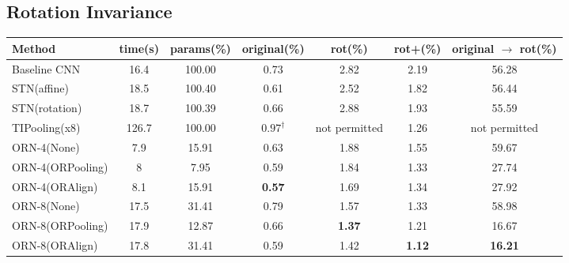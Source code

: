 \documentclass[10pt,twocolumn,letterpaper]{article}
\begin{document}
\subsection{Rotation Invariance}
\label{sec:MNIST-rot}
    \begin{table*}[t!]
        \begin{center}
            \begin{tabular}{|l|cccccc|}
                \hline
                Method            & time(s)      & params(\%)    & original(\%)  & rot(\%)       & rot+(\%)      & original
                $\rightarrow$ rot(\%) \\ \hline\hline
                Baseline CNN      & 16.4         & 100.00        & 0.73          & 2.82          & 2.19          & 56.28
                \\
                STN(affine)\cite{Jaderberg2015}    & 18.5         & 100.40        & 0.61          & 2.52          & 1.82          &
                56.44                        \\
                STN(rotation)\cite{Jaderberg2015}  & 18.7         & 100.39        & 0.66          & 2.88          & 1.93          &
                55.59                        \\
                TIPooling(x8)\cite{Laptev2016}       & 126.7        & 100.00        & $0.97^{\dagger}$          & not permitted & 1.26
                & not permitted                \\ \hline
                ORN-4(None)    & 7.9          & 15.91         & 0.63          & 1.88          & 1.55          & 59.67
                \\
                ORN-4(ORPooling) & 8            & 7.95          & 0.59          & 1.84          & 1.33          & 27.74
                \\
                ORN-4(ORAlign)   & 8.1          & 15.91         & \textbf{0.57} & 1.69          & 1.34          & 27.92
                \\
                ORN-8(None)    & 17.5         & 31.41         & 0.79          & 1.57          & 1.33          & 58.98
                \\
                ORN-8(ORPooling) & 17.9         & 12.87         & 0.66          & \textbf{1.37} & 1.21          & 16.67
                \\
                ORN-8(ORAlign)   & 17.8         & 31.41         & 0.59          & 1.42          & \textbf{1.12}& \textbf{16.21} \\
                \hline
            \end{tabular}

\end{center}
\end{table*}
\end{document}
